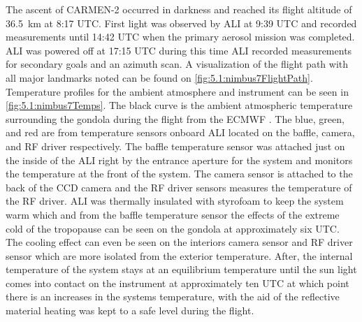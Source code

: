 The ascent of CARMEN-2 occurred in darkness and reached its flight altitude of 36.5~km at 8:17 UTC. First light was observed by ALI at 9:39 UTC and recorded measurements until 14:42 UTC when the primary aerosol mission was completed. ALI was powered off at 17:15 UTC during this time ALI recorded measurements for secondary goals and an azimuth scan. A visualization of the flight path with all major landmarks noted can be found on \autoref{fig:5.1:nimbus7FlightPath}. Temperature profiles for the ambient atmosphere and instrument can be seen in \autoref{fig:5.1:nimbus7Temps}. The black curve is the ambient atmospheric temperature surrounding the gondola during the flight from the ECMWF \citep{Molteni1996}. The blue, green, and red are from temperature sensors onboard ALI located on the baffle, camera, and RF driver respectively. The baffle temperature sensor was attached just on the inside of the ALI right by the entrance aperture for the system and monitors the temperature at the front of the system. The camera sensor is attached to the back of the CCD camera and the RF driver sensors measures the temperature of the RF driver. ALI was thermally insulated with styrofoam to keep the system warm which and from the baffle temperature sensor the effects of the extreme cold of the tropopause can be seen on the gondola at approximately six UTC. The cooling effect can even be seen on the interiors camera sensor and RF driver sensor which are more isolated from the exterior temperature. After, the internal temperature of the system stays at an equilibrium temperature until the sun light comes into contact on the instrument at approximately ten UTC at which point there is an increases in the systems temperature, with the aid of the reflective material heating was kept to a safe level during the flight. 

